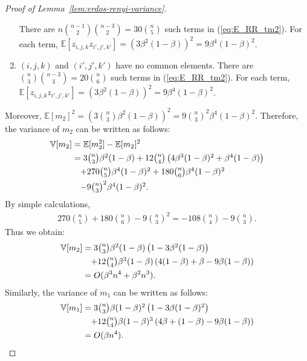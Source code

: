 \begin{proof}[Proof of Lemma~\ref{lem:erdos-renyi-variance}]
\begin{enumerate}
	There are $n \binom{n-1}{2} \binom{n-3}{2} = 30\binom{n}{5}$ such terms in (\ref{eq:E_RR_tm2}).  For each term, $\mathbb{E}[z_{i,j,k}z_{i',j',k'}]=(3\beta^2(1-\beta))^2 = 9\beta^4(1-\beta)^2$. 
	\item $(i,j,k)$ and $(i',j',k')$ have no common elements. 
	There are $\binom{n}{3}\binom{n-3}{3} = 20\binom{n}{6}$ such terms in (\ref{eq:E_RR_tm2}). 
	For each term, $\mathbb{E}[z_{i,j,k}z_{i',j',k'}]=(3\beta^2(1-\beta))^2 = 9\beta^4(1-\beta)^2$. 
\end{enumerate}
Moreover, $\mathbb{E}[m_2]^2 = (3\binom{n}{3}\beta^2(1-\beta))^2 = 9\binom{n}{3}^2\beta^4(1-\beta)^2$. 
Therefore, the variance of $m_2$ can be written as follows:
\begin{align*}
  \mathbb{V}[m_2] 
  &= \mathbb{E}[m_2^2] - \mathbb{E}[m_2]^2 \nonumber\\
  &= \textstyle{3\binom{n}{3}\beta^2(1-\beta) + 12\binom{n}{4}\left(4\beta^3(1-\beta)^2 + \beta^4(1-\beta)\right)} \nonumber\\
  &\hspace{3.5mm} \textstyle{+ 270\binom{n}{5}\beta^4(1-\beta)^2 + 180\binom{n}{6}\beta^4(1-\beta)^2} \nonumber\\
  &\hspace{3.5mm} \textstyle{- 9\binom{n}{3}^2\beta^4(1-\beta)^2.}
\end{align*}
By simple calculations,
\begin{align*}
\textstyle{270\binom{n}{5} + 180\binom{n}{6} - 9\binom{n}{3}^2 = -108\binom{n}{4}-9\binom{n}{3}.}
\end{align*}
Thus we obtain:
\begin{align*}
\mathbb{V}[m_2] 
&= \textstyle{3\binom{n}{3}\beta^2(1-\beta)\left(1 - 3\beta^2(1-\beta)\right)} \nonumber\\
&\hspace{3.5mm} \textstyle{+ 12\binom{n}{4} \beta^3(1-\beta) \left(4(1-\beta) + \beta - 9\beta(1-\beta) \right)} \\
&= O(\beta^3 n^4 + \beta^2n^3).
\end{align*}
Similarly, the variance of $m_1$ can be written as follows:
\begin{align*}
\mathbb{V}[m_1] 
&= \textstyle{3\binom{n}{3}\beta(1-\beta)^2\left(1 - 3\beta(1-\beta)^2\right)} \nonumber\\
&\hspace{3.5mm} \textstyle{+ 12\binom{n}{4} \beta(1-\beta)^3 \left(4\beta +
(1-\beta) - 9\beta(1-\beta) \right)} \\
&= O(\beta n^4).
\end{align*}
\end{proof}

